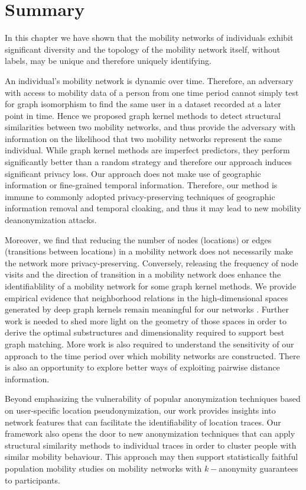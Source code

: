\section{Summary} %

In this chapter we have shown that the mobility networks of individuals exhibit significant diversity and the topology of the mobility network itself, without labels, may be unique and therefore uniquely identifying.

An individual's mobility network is dynamic over time.
Therefore, an adversary with access to mobility data of a person from one time period cannot simply test for graph isomorphism to find the same user in a dataset recorded at a later point in time.
Hence we proposed graph kernel methods to detect structural similarities between two mobility networks, and thus provide the adversary with information on the likelihood that two mobility networks represent the same individual.
While graph kernel methods are imperfect predictors, they perform significantly better than a random strategy and therefore our approach induces significant privacy loss.
Our approach does not make use of geographic information or fine-grained temporal information. Therefore, our method is immune to commonly adopted privacy-preserving techniques of geographic information removal and temporal cloaking, and thus it may lead to new mobility deanonymization attacks.

Moreover, we find that reducing the number of nodes (locations) or edges (transitions between locations) in a mobility network does not necessarily make the network more privacy-preserving.
Conversely, releasing the frequency of node visits and the direction of transition in a mobility network does enhance the identifiablility of a mobility network for some graph kernel methods.
We provide empirical evidence that neighborhood relations in the high-dimensional spaces generated by deep graph kernels remain meaningful for our networks \cite{Beyer}.
Further work is needed to shed more light on the geometry of those spaces in order to derive the optimal substructures and dimensionality required to support best graph matching.
More work is also required to understand the sensitivity of our approach to the time period over which mobility networks are constructed.
There is also an opportunity to explore better ways of exploiting pairwise distance information.

Beyond emphasizing the vulnerability of popular anonymization techniques based on user-specific location pseudonymization, our work provides insights into network features that can facilitate the identifiability of location traces.
Our framework also opens the door to new anonymization techniques that can apply structural similarity methods to individual traces in order to cluster people with similar mobility behaviour.
This approach may then support statistically faithful population mobility studies on mobility networks with $k-$anonymity guarantees to participants.

